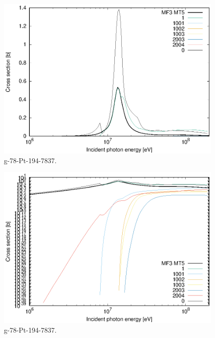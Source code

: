 \begin{figure}
 \includegraphics[width=\linewidth]{eps/g_78-Pt-194_7837.eps}
  \caption{g-78-Pt-194-7837.}
\end{figure}
\begin{figure}
 \includegraphics[width=\linewidth]{eps-log/g_78-Pt-194_7837.eps}
 \caption{g-78-Pt-194-7837.}
\end{figure}
\newpage \clearpage

